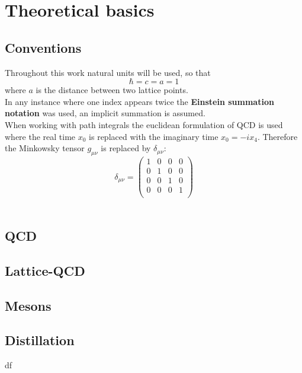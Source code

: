 \documentclass{style}
\begin{document}
	\section{Theoretical basics}
	\subsection{Conventions}
	Throughout this work natural units will be used, so that
	$$\hbar = c = a = 1$$
	where $a$ is the distance between two lattice points.\\
	
	In any instance where one index appears twice the \textbf{Einstein summation notation} was used, an implicit summation is assumed.\\
	
	When working with path integrals the euclidean formulation of QCD is used where the real time $x_0$ is replaced with the imaginary time $x_0 = -ix_4$. Therefore the Minkowsky tensor $g_{\mu\nu}$ is replaced by $\delta_{\mu\nu}$:
	$$\delta_{\mu\nu} = 
	\begin{pmatrix}
	1 & 0 & 0 & 0 \\
	0 & 1 & 0 & 0 \\
	0 & 0 & 1 & 0 \\
	0 & 0 & 0 & 1 \\
	\end{pmatrix}
	$$\\
	\cite{Rothe2012}
	
	\subsection{QCD}
	
	\subsection{Lattice-QCD}
	
	\subsection{Mesons}
	
	\subsection{Distillation}
	df
	
	
	
\end{document}
